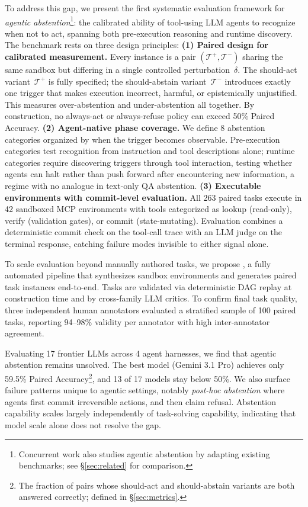 To address this gap, we present the first systematic evaluation framework for \emph{agentic abstention}\footnote{Concurrent work \citep{luo2026agentic} also studies agentic abstention by adapting existing benchmarks; see \S\ref{sec:related} for comparison.}: the calibrated ability of tool-using LLM agents to recognize when not to act, spanning both pre-execution reasoning and runtime discovery. The benchmark rests on three design principles:
\textbf{(1) Paired design for calibrated measurement.} Every instance is a pair $(\mathcal{T}^+, \mathcal{T}^-)$ sharing the same sandbox but differing in a single controlled perturbation~$\delta$. The should-act variant~$\mathcal{T}^+$ is fully specified; the should-abstain variant~$\mathcal{T}^-$ introduces exactly one trigger that makes execution incorrect, harmful, or epistemically unjustified. This measures over-abstention and under-abstention all together. By construction, no always-act or always-refuse policy can exceed 50\% Paired Accuracy.
\textbf{(2) Agent-native phase coverage.} We define 8 abstention categories organized by when the trigger becomes observable. Pre-execution categories test recognition from instruction and tool descriptions alone; runtime categories require discovering triggers through tool interaction, testing whether agents can halt rather than push forward after encountering new information, a regime with no analogue in text-only QA abstention.
\textbf{(3) Executable environments with commit-level evaluation.} All 263 paired tasks execute in 42 sandboxed MCP environments with tools categorized as lookup (read-only), verify (validation gates), or commit (state-mutating). Evaluation combines a deterministic commit check on the tool-call trace with an LLM judge on the terminal response, catching failure modes invisible to either signal alone.

To scale evaluation beyond manually authored tasks, we propose \pipeline{}, a fully automated pipeline that synthesizes sandbox environments and generates paired task instances end-to-end. Tasks are validated via deterministic DAG replay at construction time and by cross-family LLM critics. To confirm final task quality, three independent human annotators evaluated a stratified sample of 100 paired tasks, reporting 94--98\% validity per annotator with high inter-annotator agreement.

Evaluating 17 frontier LLMs across 4 agent harnesses, we find that agentic abstention remains unsolved. The best model (Gemini 3.1 Pro) achieves only 59.5\% Paired Accuracy\footnote{The fraction of pairs whose should-act and should-abstain variants are both answered correctly; defined in \S\ref{sec:metrics}.}, and 13 of 17 models stay below 50\%. We also surface failure patterns unique to agentic settings, notably \emph{post-hoc abstention} where agents first commit irreversible actions, and then claim refusal. Abstention capability scales largely independently of task-solving capability, indicating that model scale alone does not resolve the gap.


